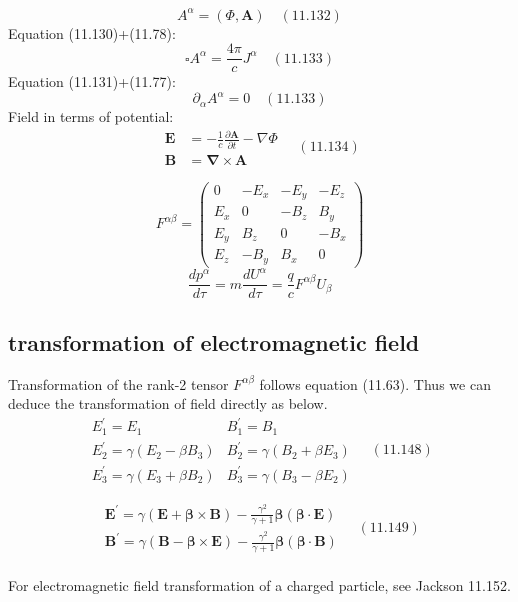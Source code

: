 \documentclass[10pt, oneside]{article}   	%
\begin{document}
\begin{multicols}{2}
$$A^\alpha=(\Phi, \mathbf{A})\quad(11.132)$$
Equation (11.130)+(11.78):\\
$$\square A^{\alpha}=\frac{4 \pi}{c} J^{\alpha}\quad(11.133)$$
Equation (11.131)+(11.77):\\
$$\partial_{\alpha} A^{\alpha}=0\quad(11.133)$$
Field in terms of potential:\\
$$\begin{aligned} \mathbf{E} &=-\frac{1}{c} \frac{\partial \mathbf{A}}{\partial t}-\nabla \Phi \\ \mathbf{B} &=\mathbf{\nabla} \times \mathbf{A} \end{aligned}\quad(11.134)$$

$$F^{\alpha \beta}=\left(\begin{array}{cccc}0 & -E_{x} & -E_{y} & -E_{z} \\ E_{x} & 0 & -B_{z} & B_{y} \\ E_{y} & B_{z} & 0 & -B_{x} \\ E_{z} & -B_{y} & B_{x} & 0\end{array}\right)$$
$$\frac{d p^{\alpha}}{d \tau}=m \frac{d U^{\alpha}}{d \tau}=\frac{q}{c} F^{\alpha \beta} U_{\beta}$$

\subsection{transformation of electromagnetic field}
Transformation of the rank-2 tensor $F^{\alpha \beta}$ follows equation (11.63).
Thus we can deduce the transformation of field directly as below.
$$\begin{array}{ll}E_{1}^{\prime}=E_{1} & B_{1}^{\prime}=B_{1} \\ E_{2}^{\prime}=\gamma\left(E_{2}-\beta B_{3}\right) & B_{2}^{\prime}=\gamma\left(B_{2}+\beta E_{3}\right) \\ E_{3}^{\prime}=\gamma\left(E_{3}+\beta B_{2}\right) & B_{3}^{\prime}=\gamma\left(B_{3}-\beta E_{2}\right)\end{array}\quad(11.148)$$

$$\begin{array}{l}\mathbf{E}^{\prime}=\gamma(\mathbf{E}+\boldsymbol{\beta} \times \mathbf{B})-\frac{\gamma^{2}}{\gamma+1} \boldsymbol{\beta}(\boldsymbol{\beta} \cdot \mathbf{E}) \\ \mathbf{B}^{\prime}=\gamma(\mathbf{B}-\boldsymbol{\beta} \times \mathbf{E})-\frac{\gamma^{2}}{\gamma+1} \boldsymbol{\beta}(\boldsymbol{\beta} \cdot \mathbf{B})\end{array}\quad(11.149)$$
\\
For electromagnetic field transformation of a charged particle, see Jackson 11.152.





\end{multicols}
\end{document}
